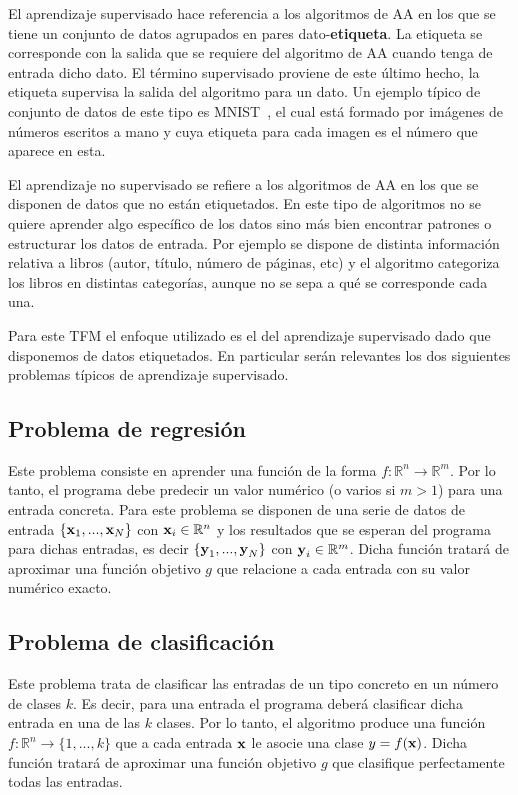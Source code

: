 El aprendizaje supervisado hace referencia a los algoritmos de AA en los que se tiene un conjunto de datos agrupados en pares dato-\textbf{etiqueta}.  La etiqueta se corresponde con la salida que se requiere del algoritmo de AA cuando tenga de entrada dicho dato. El término supervisado proviene de este último hecho, la etiqueta supervisa la salida del algoritmo para un dato. Un ejemplo típico de conjunto de datos de este tipo es MNIST~\cite{mnist}, el cual está formado por imágenes de números escritos a mano y cuya etiqueta para cada imagen es el número que aparece en esta.

El aprendizaje no supervisado se refiere a los algoritmos de AA en los que se disponen de datos que no están etiquetados. En este tipo de algoritmos no se quiere aprender algo específico de los datos sino más bien encontrar patrones o estructurar los datos de entrada. Por ejemplo se dispone de distinta información relativa a libros (autor, título, número de páginas, etc) y el algoritmo categoriza los libros en distintas categorías, aunque no se sepa a qué se corresponde cada una.


Para este TFM el enfoque utilizado es el del aprendizaje supervisado dado que disponemos de datos etiquetados. En particular serán relevantes los dos siguientes problemas típicos de aprendizaje supervisado.

\subsection{Problema de regresión}
Este problema consiste en aprender una función de la forma $f:\mathbb{R}^n \rightarrow\mathbb{R}^m$. Por lo tanto, el programa debe predecir un valor numérico (o varios si $m > 1$) para una entrada concreta. Para este problema se disponen de una serie de datos de entrada $\{\textnormal{\textbf{x}}_1,...,\textnormal{\textbf{x}}_N\}$ con $\textnormal{\textbf{x}}_i\in\mathbb{R}^n$ y los resultados que se esperan del programa para dichas entradas, es decir $\{\textnormal{\textbf{y}}_1,...,\textnormal{\textbf{y}}_N\}$ con $\textnormal{\textbf{y}}_i \in \mathbb{R}^m$. Dicha función tratará de aproximar una función objetivo $g$ que relacione a cada entrada con su valor numérico exacto. 

\subsection{Problema de clasificación}
Este problema trata de clasificar las entradas de un tipo concreto en un número de clases $k$. Es decir, para una entrada el programa deberá clasificar dicha entrada en una de las $k$ clases. Por lo tanto, el algoritmo produce una función $f:\mathbb{R}^n \rightarrow \{1,...,k\}$ que a cada entrada $\textnormal{\textbf{x}}$ le asocie una clase $y = f(\textnormal{\textbf{x}})$. Dicha función tratará de aproximar una función objetivo $g$ que clasifique perfectamente todas las entradas.

